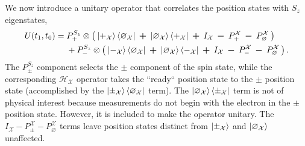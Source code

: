 We now introduce a unitary operator that correlates the position states with $S_z$ eigenstates,
\begin{align} \label{eq: Experiment 1 unitary operator}
  U(t_1, t_0) &= P^{S_z}_+ \otimes \left(\: \ket{+_{\mathcal{X}}}\bra{\varnothing_\mathcal{X}} \: \bm{+} \: \ket{\varnothing_\mathcal{X}}\bra{+_\mathcal{X}} \: \bm{+} \: I_\mathcal{X} \: \bm{-} \: P^\mathcal{X}_+  \: \bm{-} \: P^\mathcal{X}_\varnothing \: \right) \\ \nonumber
  &\phantom{{}={}} + P^{S_z}_- \otimes \left( \: \ket{-_{\mathcal{X}}}\bra{\varnothing_\mathcal{X}} \: \bm{+} \: \ket{\varnothing_\mathcal{X}}\bra{-_\mathcal{X}} \: \bm{+} \: I_\mathcal{X} \: \bm{-} \: P^\mathcal{X}_-  \: \bm{-} \: P^\mathcal{X}_\varnothing \: \right).
\end{align}
The $P^{S_z}_\pm$ component selects the $\pm$ component of the spin state, while the corresponding $\mathcal{H}_\mathcal{X}$ operator takes the ``ready`` position state to the $\pm$ position state (accomplished by the $\ket{\pm_\mathcal{X}}\bra{\varnothing_\mathcal{X}}$ term). The $\ket{\varnothing_\mathcal{X}}\bra{\pm_\mathcal{X}}$ term is not of physical interest because measurements do not begin with the electron in the $\pm$ position state. However, it is included to make the operator unitary. The $I_\mathcal{X} - P^\mathcal{X}_\pm - P^\mathcal{X}_\varnothing$ terms leave position states distinct from $\ket{\pm_\mathcal{X}}$ and $\ket{\varnothing_\mathcal{X}}$ unaffected.

